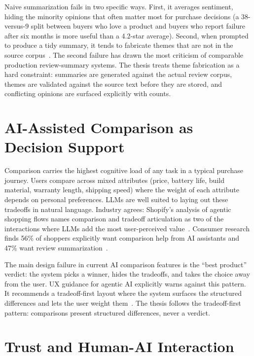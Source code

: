 Naive summarization fails in two specific ways. First, it
averages sentiment, hiding the minority opinions that often
matter most for purchase decisions (a 38-versus-9 split
between buyers who love a product and buyers who report failure
after six months is more useful than a 4.2-star average). Second,
when prompted to produce a tidy summary, it tends to fabricate
themes that are not in the source
corpus~\cite{RufusConfidentlyWrong2024}. The second failure has
drawn the most criticism of comparable production review-summary
systems. The thesis treats theme fabrication as a hard
constraint: summaries are generated against the actual review
corpus, themes are validated against the source text before they
are stored, and conflicting opinions are surfaced explicitly
with counts.

\section{AI-Assisted Comparison as Decision Support}
\label{sec:bg-comparison}

Comparison carries the highest cognitive load of any task in a
typical purchase journey. Users compare across mixed attributes
(price, battery life, build material, warranty length, shipping
speed) where the weight of each attribute depends on personal
preferences. LLMs are well suited to laying out these tradeoffs
in natural language. Industry agrees: Shopify's analysis of
agentic shopping flows names comparison and tradeoff articulation
as two of the interactions where LLMs add the most user-perceived
value~\cite{ShopifyAgentic}. Consumer research finds 56\% of
shoppers explicitly want comparison help from AI assistants and
47\% want review summarization~\cite{DigidayAIShopping}.

The main design failure in current AI comparison features is the
``best product'' verdict: the system picks a winner, hides the
tradeoffs, and takes the choice away from the user. UX guidance
for agentic AI explicitly warns against this pattern. It
recommends a tradeoff-first layout where the system surfaces the
structured differences and lets the user weight
them~\cite{SmashingAgenticUX}. The thesis follows the
tradeoff-first pattern: comparisons present structured
differences, never a verdict.

\section{Trust and Human-AI Interaction}
\label{sec:bg-trust}

